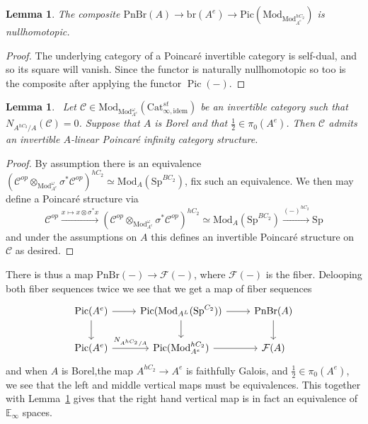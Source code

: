 \documentclass{article}
\DeclareMathOperator{\Pic}{Pic} %
\newcommand{\pnbr}{\ensuremath{\mathrm{PnBr}}}
\newtheorem{lemma}[equation]{Lemma}
\theoremstyle{definition}
\begin{document}
	\begin{lemma}
		The composite $\pnbr(A)\to \mathrm{br}(A^e)\to \mathrm{Pic}(\mathrm{Mod}_{\mathrm{Mod}_{A^e}^{hC_2}})$ is nullhomotopic. 
	\end{lemma}
	\begin{proof}
		The underlying category of a Poincar{\'e} invertible category is self-dual, and so its square will vanish. Since the functor is naturally nullhomotopic so too is the composite after applying the functor $\Pic(-)$.
	\end{proof}

    \begin{lemma}~\label{lem: surjection onto kernel PS sequence}
        Let $\mathcal{C}\in \mathrm{Mod}_{\mathrm{Mod}_{A^e}^\omega}(\mathrm{Cat}^{st}_{\infty,\textrm{idem}})$ be an invertible category such that $N_{A^{hC_2}/A}(\mathcal{C})=0$. Suppose that $A$ is Borel and that $\frac{1}{2}\in \pi_0(A^e)$. Then $\mathcal{C}$ admits an invertible $A$-linear Poincar{\'e} infinity category structure.
    \end{lemma}
    \begin{proof}
        By assumption there is an equivalence $(\mathcal{C}^{op}\otimes_{\mathrm{Mod}_{A^e}^\omega}\sigma^*\mathcal{C}^{op})^{hC_2}\simeq \mathrm{Mod}_{A}(\mathrm{Sp}^{BC_2})$, fix such an equivalence. We then may define a Poincar{\'e} structure via \[\mathcal{C}^{op}\xrightarrow{x\mapsto x\otimes \sigma^*x}\left(\mathcal{C}^{op}\otimes_{\mathrm{Mod}_{A^e}^\omega}\sigma^*\mathcal{C}^{op}\right)^{hC_2}\simeq \mathrm{Mod}_A(\mathrm{Sp}^{BC_2})\xrightarrow{(-)^{hC_2}}\mathrm{Sp}\] and under the assumptions on $A$ this defines an invertible Poincar{\'e} structure on $\mathcal{C}$ as desired.
    \end{proof}
	
	There is thus a map $\pnbr(-)\to \mathcal{F}(-)$, where $\mathcal{F}(-)$ is the fiber. Delooping both fiber sequences twice we see that we get a map of fiber sequences \[
	\begin{tikzcd}
		\Pic(A^e)\ar[r] \ar[d] & \Pic(\mathrm{Mod}_{A^L}(\mathrm{Sp}^{C_2})) \ar[r] \ar[d] & \pnbr(A) \ar[d]\\
		\Pic(A^e)\ar[r,"N_{A^{hC_2}/A}"] &\Pic(\mathrm{Mod}_{A^e}^{hC_2}) \ar[r] & \mathcal{F}(A) 
	\end{tikzcd}
	\]
	and when $A$ is Borel,the map $A^{hC_2}\to A^e$ is faithfully Galois, and $\frac{1}{2}\in \pi_0(A^e)$, we see that the left and middle vertical maps must be equivalences. This together with Lemma~\ref{lem: surjection onto kernel PS sequence} gives that the right hand vertical map is in fact an equivalence of $\mathbb{E}_\infty$ spaces.
\end{document}
